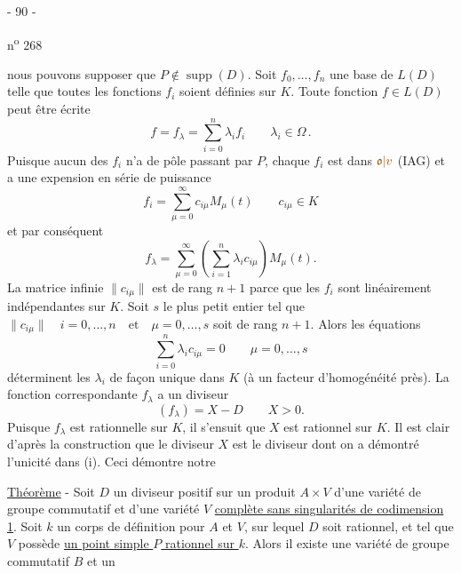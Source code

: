 \begin{center}- 90 -\end{center}\hfill n\textsuperscript{o} 268

nous pouvons supposer que $P\notin\operatorname{supp}(D)$. Soit $f_0,\ldots,f_n$ une base de $L(D)$ telle que toutes les fonctions $f_i$ soient définies sur $K$. Toute fonction $f\in L(D)$ peut être écrite
\[
f=f_\lambda=\sum_{i=0}^n\lambda_i f_i\qquad\lambda_i\in\Omega\,.
\]
Puisque aucun des $f_i$ n'a de pôle passant par $P$, chaque $f_i$ est dans $\unsure{\mathfrak{o}|v}$ (IAG) et a une expension en série de puissance
\[
f_i=\sum_{\mu=0}^{\infty}c_{i\mu}M_\mu(t)\qquad c_{i\mu}\in K
\]
et par conséquent
\[
f_\lambda=\sum_{\mu=0}^{\infty}\left(\sum_{i=1}^n\lambda_i c_{i\mu}\right)M_\mu(t).
\]
La matrice infinie $\|c_{i\mu}\|$ est de rang $n+1$ parce que les $f_i$ sont linéairement indépendantes sur $K$. Soit $s$ le plus petit entier tel que $\|c_{i\mu}\|\quad i=0,\ldots,n\quad\text{et}\quad\mu=0,\ldots,s$ soit de rang $n+1$. Alors les équations
\[
\sum_{i=0}^n\lambda_i c_{i\mu}=0\qquad\mu=0,\ldots,s
\]
déterminent les $\lambda_i$ de façon unique dans $K$ (à un facteur d'homogénéité près). La fonction correspondante $f_\lambda$ a un diviseur
\[
(f_\lambda)=X-D\qquad X>0.
\]
Puisque $f_\lambda$ est rationnelle sur $K$, il s'ensuit que $X$ est rationnel sur $K$. Il est clair d'après la construction que le diviseur $X$ est le diviseur dont on a démontré l'unicité dans (i). Ceci démontre notre  

\uline{Théorème} - Soit $D$ un diviseur positif sur un produit $A\times V$ d'une variété de groupe commutatif et d'une variété $V$ \uline{complète sans singularités de codimension 1}. Soit $k$ un corps de définition pour $A$ et $V$, sur lequel $D$ soit rationnel, et tel que $V$ possède \uline{un point simple $P$ rationnel sur $k$}. Alors il existe une variété de groupe commutatif $B$ et un
